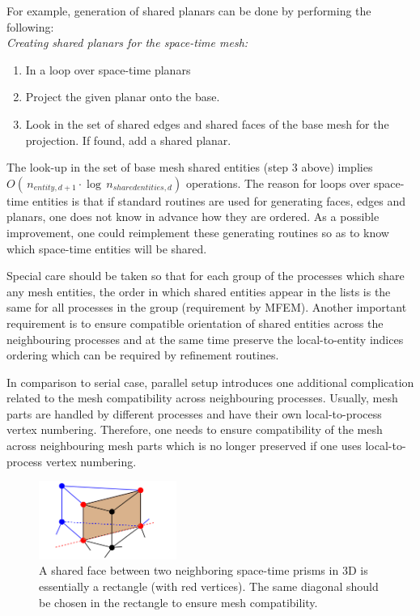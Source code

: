\documentclass[12pt]{article}
\begin{document}
For example, generation of shared planars can be done by performing the following: \\
\textit{Creating shared planars for the space-time mesh:}
\begin{enumerate}
	\item[] In a loop over space-time planars
	\item Project the given planar onto the base. 
	\item Look in the set of shared edges and shared faces of the base mesh for the projection. If found, add a shared planar.
\end{enumerate}

The look-up in the set of base mesh shared entities (step 3 above) implies $O(\,n_{entity, d+1} \cdot \log \, n_{shared entities,d})$ operations. The reason for loops over space-time entities is that if standard routines are used for generating faces, edges and planars, one does not know in advance how they are ordered. As a possible improvement, one could reimplement these generating routines so as to know which space-time entities will be shared.

Special care should be taken so that for each group of the processes which share any mesh entities, the order in which shared entities appear in the lists is the same for all processes in the group (requirement by MFEM).
Another important requirement is to ensure compatible orientation of shared entities across the neighbouring processes and at the same time preserve the local-to-entity indices ordering which can be required by refinement routines. 

In comparison to serial case, parallel setup introduces one additional complication related to the mesh compatibility across neighbouring processes. Usually, mesh parts are handled by different processes and have their own local-to-process vertex numbering. Therefore, one needs to ensure compatibility of the mesh across neighbouring mesh parts which is no longer preserved if one uses local-to-process vertex numbering.

\begin{figure}[h]
\centering
\includegraphics[width = 0.4\textwidth]{shared_face_prism.png}
\caption{A shared face between two neighboring space-time prisms in 3D is essentially a rectangle (with red vertices). The same diagonal should be chosen in the rectangle to ensure mesh compatibility. }
\end{figure}
\end{document}

